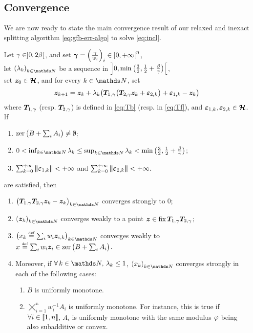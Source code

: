 \subsection{Convergence}
\label{sec:convergence}
We are now ready to state the main convergence result of our relaxed and inexact \GFB splitting algorithm \eqref{eq:gfb-err-algo} to solve \eqref{eq:incl}.
\begin{theorem}
Let $\gamma \in ]0,2\beta[$, and set $\boldsymbol{\gamma} = \left( \frac{\gamma}{w_i} \right)_i \in {]0,{+}\infty[}^n$, \\
let $\pa{\la_k}_{k \in \N}$ be a sequence in $\left]0,\min \big( {\textstyle \frac{3}{2}},{\textstyle \frac{1}{2}}+{\textstyle \frac{\beta}{\gamma}} \big)\right[$,\\
set $\boldsymbol z_0 \in \boldsymbol {\mathcal{H}}$, and for every $k \in \N$, set
%
\begin{equation}\label{eq:gfb-err}
\bz_{k+1} = \bz_k + \la_k \bpa{\Tb \bpa{ \Tf \bz_k + \bEps_{2,k} } + \bEps_{1,k} - \bz_k}
\end{equation}
% 
where $\boldsymbol T_{1,\boldsymbol{\gamma}}$ (resp. $\boldsymbol T_{2,\gamma}$) is defined in \eqref{eq:Tb} (resp. in \eqref{eq:Tf}),
and $\boldsymbol{\varepsilon}_{1,k}, \boldsymbol{\varepsilon}_{2,k} \in \boldsymbol {\mathcal{H}}$. If
%
\begin{enumerate}[label={\rm (\roman{*})}, ref={\rm (\roman{*})}]
	\item{\label{h:non-empty}} $\operatorname{zer}\big( B+\sum_i A_i \big) \neq \emptyset$;
	\item{\label{h:lim-la}} $0 < \inf_{k \in \N} \la_k \leq \sup_{k \in \N} \la_k < \min \bpa{\textfrac{3}{2},\textfrac{1}{2}+\textfrac{\be}{\ga}}$;
	\item{\label{h:sum-err}} $\sum_{k=0}^{{+}\infty} \bm{|\kern-1pt|} \boldsymbol{\varepsilon}_{1,k} \bm{|\kern-1pt|} < {+}\infty$ and $\sum_{k=0}^{{+}\infty} \bm{|\kern-1pt|} \boldsymbol{\varepsilon}_{2,k} \bm{|\kern-1pt|} < {+}\infty$.
\end{enumerate} 
%
are satisfied, then
\begin{enumerate}[label={\rm (\alph{*})}, ref={\rm (\alph{*})}]
	\item{\label{claim:Tz}} $\bpa{\Tb \Tf \bz_k - \bz_k}_{k \in \N}$ converges strongly to $0$;
	\item{\label{claim:z}} $\pa{\bz_k}_{k \in \N}$ converges weakly to a point $\boldsymbol z \in \operatorname{fix} \boldsymbol T_{1,\boldsymbol{\gamma}} \boldsymbol T_{2,\gamma}$;
	\item{\label{claim:x}} $\bpa{x_k \eqdef \sum_i w_i\bz_{i,k}}_{k \in \N}$ converges weakly to $x \stackrel{\mathrm{\scriptscriptstyle{def}}}{=} \sum_i w_i \boldsymbol z_i \in \operatorname{zer}{\big( B+\sum_i A_i \big)}$.\\
		\newline
\item{\label{claim:strong}} Moreover, if $\foralls k \in \N, \, \la_k \leq 1$, $\pa{x_k}_{k \in \N}$ converges strongly in each of the following cases: 
\begin{enumerate}[label={\rm (\arabic{*})}, ref={\rm (\arabic{*})}]
\item{\label{claim:strongB}} $B$ is uniformly monotone.
\item{\label{claim:strongA}} $\bigtimes_{i=1}^n w_i^{-1} A_i$ is uniformly monotone. For instance, this is true if $\forall i \in \llbracket1,n\rrbracket$, $A_i$ is uniformly monotone with the same modulus $\varphi$ being also subadditive or convex.
\end{enumerate} 
\end{enumerate}
\label{thm:gfb}
\end{theorem}

